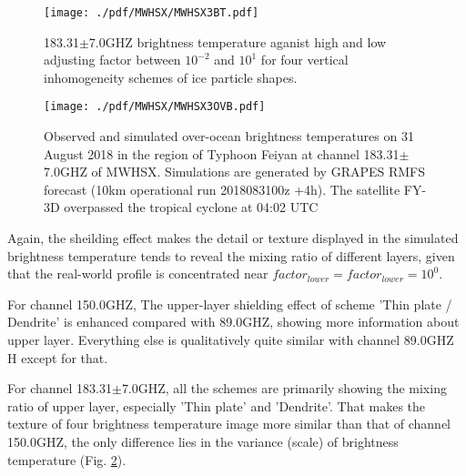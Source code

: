 \begin{figure}[hbtp] 
\centering
\texttt{[image: ./pdf/MWHSX/MWHSX3BT.pdf]}
\caption{183.31$\pm$7.0GHZ brightness temperature aganist high and low adjusting factor between $10^{-2}$ and $10^{1}$ for four vertical 
inhomogeneity schemes of ice particle shapes.}
\label{fig:MWHSX3BT}
\end{figure}

\begin{figure}[hbtp] 
\centering
\texttt{[image: ./pdf/MWHSX/MWHSX3OVB.pdf]}
\caption{Observed and simulated over-ocean brightness temperatures on 31 August 2018 in the region of Typhoon Feiyan at channel 183.31$\pm$7.0GHZ of MWHSX.
Simulations are generated by GRAPES RMFS forecast (10km operational run 2018083100z +4h). The satellite FY-3D overpassed the
tropical cyclone at 04:02 UTC}
\label{fig:MWHSX3OVB}
\end{figure}

Again, the sheilding effect makes the detail or texture displayed in the simulated brightness temperature tends to reveal the mixing ratio of different layers, given that
the real-world profile is concentrated near $factor_{lower} = factor_{lower} = 10^{0}$.

For channel 150.0GHZ, The upper-layer shielding effect of scheme 'Thin plate / Dendrite' is enhanced compared with 89.0GHZ, showing more information about upper layer.
Everything else is qualitatively quite similar with channel 89.0GHZ H except for that.

For channel 183.31$\pm$7.0GHZ, all the schemes are primarily showing the mixing ratio of upper layer, especially 'Thin plate' and 'Dendrite'. 
That makes the texture of four brightness temperature image more similar than that of channel 150.0GHZ, 
the only difference lies in the variance (scale) of brightness temperature (Fig. \ref{fig:MWHSX3OVB}).

\clearpage